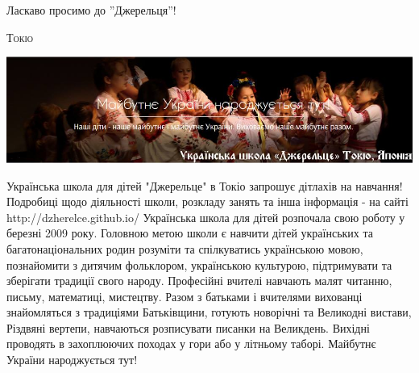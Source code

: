 \documentclass[10pt,a4paper]{article}
\newcommand{\NewsItem}[1]{%
		\usefont{T2A}{iwona}{m}{n} 
		\large #1 \vspace{4pt}
		\par \normalsize \normalfont}
\newcommand{\NewsAuthor}[1]{%
			\hfill \textsc{#1} \vspace{4pt}
			\par \normalfont}
\begin{document}
\begin{multicols}{3}
\NewsItem{Ласкаво просимо до ''Джерельця''!}
\NewsAuthor{Токіо}
		\begin{center}
			\includegraphics[width=0.8\linewidth]{images/dzherelce}
		\end{center}
Українська школа для дітей "Джерельце" в Токіо запрошує дітлахів на навчання! Подробиці щодо діяльності школи, розкладу занять та інша інформація - на сайті http://dzherelce.github.io/
Українська школа для дітей розпочала свою роботу у березні 2009 року. Головною метою школи є навчити дітей українських та багатонаціональних родин розуміти та спілкуватись українською мовою, познайомити з дитячим фольклором, українською культурою, підтримувати та зберігати традиції свого народу. Професійні вчителі навчають малят читанню, письму, математиці, мистецтву. Разом з батьками і вчителями вихованці знайомляться з традиціями Батьківщини, готують новорічні та Великодні вистави, Різдвяні вертепи, навчаються розписувати писанки на Великдень. Вихідні проводять в захоплюючих походах у гори або у літньому таборі. Майбутнє України народжується тут!


\end{multicols}
\end{document}
